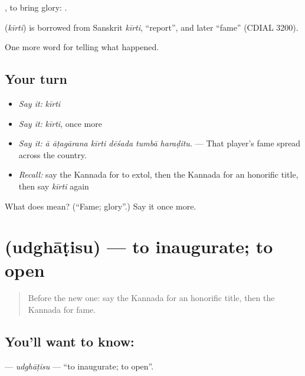  , to bring glory:    .

\begin{cousinweb}
\textbf{} (\emph{kīrti}) is borrowed from Sanskrit \emph{kīrti}, \textquotedblleft{}report\textquotedblright{}, and later \textquotedblleft{}fame\textquotedblright{} (CDIAL 3200).
\end{cousinweb}

\begin{grammarlens}[title={What you've built}]
One more word for telling what happened.
\end{grammarlens}

\subsection*{Your turn}
\begin{itemize}
\raggedright
  \item \emph{Say it:} \emph{kīrti}
  \item \emph{Say it:} \emph{kīrti}, once more
  \item \emph{Say it:} \emph{ā āṭagārana kīrti dēśada tumbā haraḍitu.} — That player's fame spread across the country.
  \item \emph{Recall:} say the Kannada for to extol, then the Kannada for an honorific title, then say \emph{kīrti} again
\end{itemize}

\begin{tcolorbox}[breakable,colback=teal!4,colframe=teal!35!black,title={Before you move on}]
What does  mean? (\textquotedblleft{}Fame; glory\textquotedblright{}.) Say it once more.
\end{tcolorbox}
\section[\texorpdfstring{\kn{ಉದ್ಘಾಟಿಸು} (udghāṭisu)}{ಉದ್ಘಾಟಿಸು (udghāṭisu)}]{ (udghāṭisu) — to inaugurate; to open}

\label{lesson:KA-C350-udghatisu}



\begin{quote}
Before the new one: say the Kannada for an honorific title, then the Kannada for fame.
\end{quote}

\subsection*{You'll want to know: }
\textbf{} — \emph{udghāṭisu} — \textquotedblleft{}to inaugurate; to open\textquotedblright{}.

